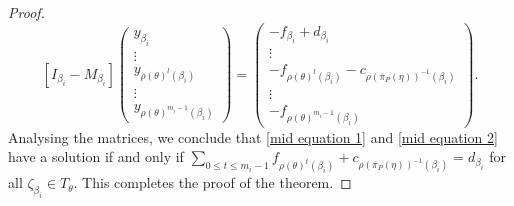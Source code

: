\documentclass[10pt,a4paper]{amsart}
\begin{document}
\begin{proof}
$$
[I_{\beta_i}-M_{\beta_i}]
\left(\begin{matrix}
	y_{\beta_i}\\
	\vdots\\
		y_{\rho(\theta)^l(\beta_i)}\\
	\vdots\\
	y_{\rho(\theta)^{m_{i}-1}(\beta_i)}
\end{matrix}\right)=
\left(\begin{matrix}	-f_{\beta_i}+d_{\beta_i}\\
	\vdots\\
		-f_{\rho(\theta)^l(\beta_i)}-c_{\rho(\overline{\pi}_P(\eta))^{-1}(\beta_i)}\\
	\vdots\\
	-f_{\rho(\theta)^{m_{i}-1}(\beta_i)}
\end{matrix}\right).
$$ 
Analysing the matrices, we conclude that \eqref{mid equation 1} and \eqref{mid equation 2} have a solution if and only if $\sum_{0\le t \le m_i-1}f_{\rho(\theta)^{t}(\beta_i)}+c_{\rho(\overline{\pi}_P(\eta))^{-1}(\beta_i)}=d_{\beta_i}$ for all $\zeta_{\beta_i}\in T_{\theta}$. This completes the proof of the theorem.
\end{proof}
\end{document}

